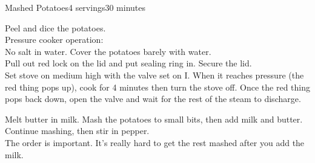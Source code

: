 \documentclass[../Cookbook.tex]{subfiles}
\begin{document}
\begin{recipe}[MashedPotatoes]{Mashed Potatoes}{4 servings}{30 minutes}

Peel and dice the potatoes.\\
Pressure cooker operation:\\
No salt in water. Cover the potatoes barely with water.\\
Pull out red lock on the lid and put sealing ring in. Secure the lid.\\
Set stove on medium high with the valve set on I. When it reaches pressure (the red thing pops up), cook for 4 minutes then turn the stove off. Once the red thing pops back down, open the valve and wait for the rest of the steam to discharge.

Melt butter in milk. Mash the potatoes to small bits, then add milk and butter. Continue mashing, then stir in pepper.\\
The order is important. It's really hard to get the rest mashed after you add the milk.

\end{recipe}
\end{document}
